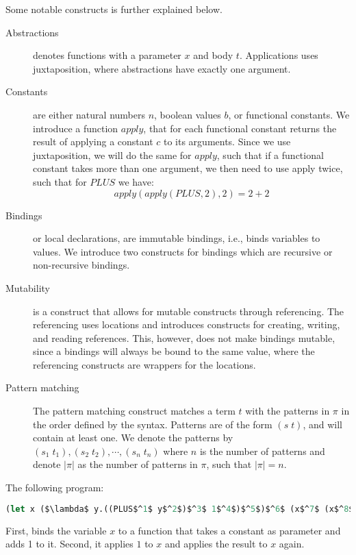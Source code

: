 \documentclass[../../master.tex]{subfiles}
\begin{document}
Some notable constructs is further explained below.
\begin{description}
	\item[Abstractions] denotes functions with a parameter $x$ and body $t$.
		Applications uses juxtaposition, where abstractions have exactly one argument.

	\item[Constants] are either natural numbers $n$, boolean values $b$, or functional constants.
		We introduce a function $apply$, that for each functional constant returns the result of applying a constant $c$ to its arguments.
		Since we use juxtaposition, we will do the same for $apply$, such that if a functional constant takes more than one argument, we then need to use apply twice, such that for $PLUS$ we have:
		$$apply(apply(PLUS,2),2)=2+2$$

	\item[Bindings] or local declarations, are immutable bindings, i.e., binds variables to values.
		We introduce two constructs for bindings which are recursive or non-recursive bindings.

	\item[Mutability] is a construct that allows for mutable constructs through referencing.
		The referencing uses locations and introduces constructs for creating, writing, and reading references.
		This, however, does not make bindings mutable, since a bindings will always be bound to the same value, where the referencing constructs are wrappers for the locations.

	\item[Pattern matching] The pattern matching construct matches a term $t$ with the patterns in $\pi$ in the order defined by the syntax.
		Patterns are of the form $(s\;t)$, and will contain at least one.
		We denote the patterns by $(s_1\;t_1),(s_2\;t_2),\cdots,(s_n\;t_n)$ where $n$ is the number of patterns and denote $|\pi|$ as the number of patterns in $\pi$, such that $|\pi|=n$.
\end{description}

\begin{example}[]
The following program:
\begin{lstlisting}[language=Caml, mathescape=true]
(let x ($\lambda$ y.((PLUS$^1$ y$^2$)$^3$ 1$^4$)$^5$)$^6$ (x$^7$ (x$^8$ 1$^9$)$^{10}$)$^{11}$)$^{12}$
\end{lstlisting}
First, binds the variable $x$ to a function that takes a constant as parameter and adds 1 to it.
Second, it applies $1$ to $x$ and applies the result to $x$ again.
\end{example}
\end{document}

